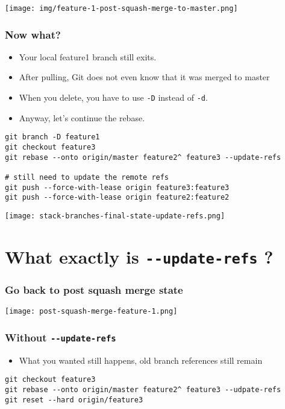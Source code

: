 \documentclass[11pt]{article}
\begin{document}
\begin{center}
\texttt{[image: img/feature-1-post-squash-merge-to-master.png]}
\label{orgd916233}
\end{center}
\subsubsection{Now what?}
\label{sec:orgda474e6}
\begin{itemize}
\item Your local feature1 branch still exits.
\item After pulling, Git does not even know that it was merged to master
\item When you delete, you have to use \texttt{-D} instead of \texttt{-d}.
\item Anyway, let's continue the rebase.
\end{itemize}
\begin{verbatim}
git branch -D feature1
git checkout feature3
git rebase --onto origin/master feature2^ feature3 --update-refs

# still need to update the remote refs
git push --force-with-lease origin feature3:feature3
git push --force-with-lease origin feature2:feature2
\end{verbatim}

\begin{center}
\texttt{[image: stack-branches-final-state-update-refs.png]}
\label{org95d0a76}
\end{center}
\section{What exactly is \texttt{-{}-{}update-refs} ?}
\label{sec:orgabe3f09}

\subsubsection{Go back to post squash merge state}
\label{sec:org28a6f85}
\begin{center}
\texttt{[image: post-squash-merge-feature-1.png]}
\label{orgf5ca200}
\end{center}
\subsubsection{Without \texttt{-{}-{}update-refs}}
\label{sec:org3ab16ce}
\begin{itemize}
\item What you wanted still happens, old branch references still remain
\end{itemize}
\begin{verbatim}
git checkout feature3
git rebase --onto origin/master feature2^ feature3 --udpate-refs
git reset --hard origin/feature3

\end{verbatim}
\end{document}
